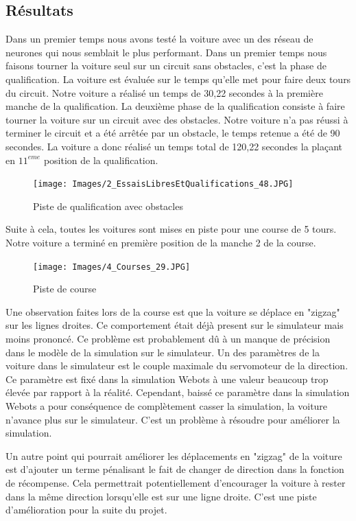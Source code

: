 \documentclass[french]{article}
\begin{document}
\subsection{Résultats}

Dans un premier temps nous avons testé la voiture avec un des réseau de neurones qui nous semblait le plus performant.
Dans un premier temps nous faisons tourner la voiture seul sur un circuit sans obstacles, c'est la phase de 
qualification. La voiture est évaluée sur le temps qu'elle met pour faire deux tours du circuit. Notre voiture a
réalisé un temps de 30,22 secondes à la première manche de la qualification. La deuxième phase de la qualification
consiste à faire tourner la voiture sur un circuit avec des obstacles. Notre voiture n'a pas réussi à terminer le
circuit et a été arrêtée par un obstacle, le temps retenue a été de 90 secondes. La voiture a donc réalisé un temps
total de 120,22 secondes la plaçant en $11^{eme}$ position de la qualification.

\begin{figure}[H]
    \centering
    \texttt{[image: Images/2\_EssaisLibresEtQualifications\_48.JPG]}
    \caption{Piste de qualification avec obstacles}
\end{figure}

Suite à cela, toutes les voitures sont mises en piste pour une course de 5 tours. Notre voiture a terminé en première 
position de la manche 2 de la course.

\begin{figure}[H]
    \centering
    \texttt{[image: Images/4\_Courses\_29.JPG]}
    \caption{Piste de course}
\end{figure}

Une observation faites lors de la course est que la voiture se déplace en "zigzag" sur les lignes droites. Ce 
comportement était déjà present sur le simulateur mais moins prononcé. Ce problème est probablement dû à un manque
de précision dans le modèle de la simulation sur le simulateur. Un des paramètres de la voiture dans le simulateur
est le couple maximale du servomoteur de la direction. Ce paramètre est fixé dans la simulation Webots à une valeur
beaucoup trop élevée par rapport à la réalité. Cependant, baissé ce paramètre dans la simulation Webots a pour
conséquence de complètement casser la simulation, la voiture n'avance plus sur le simulateur. C'est un problème 
à résoudre pour améliorer la simulation.

\vspace{0.5cm}
Un autre point qui pourrait améliorer les déplacements en "zigzag" de la voiture est d'ajouter un terme pénalisant 
le fait de changer de direction dans la fonction de récompense. Cela permettrait potentiellement d'encourager la 
voiture à rester dans la même direction lorsqu'elle est sur une ligne droite. C'est une piste d'amélioration pour 
la suite du projet.
\end{document}

